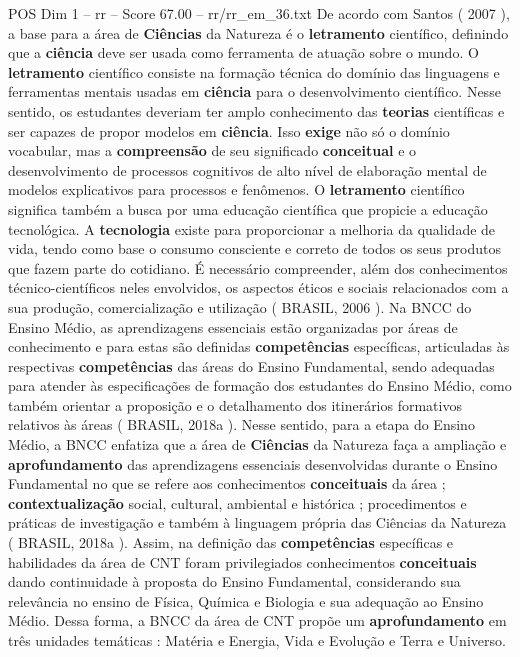 \begin{textsample}{POS Dim 1 – rr – Score 67.00 – rr/rr\_em\_36.txt}
De acordo com Santos ( 2007 ), a base para a área de \textbf{Ciências} da Natureza é o \textbf{letramento} científico, definindo que a \textbf{ciência} deve ser usada como ferramenta de atuação sobre o mundo.
O \textbf{letramento} científico consiste na formação técnica do domínio das linguagens e ferramentas mentais usadas em \textbf{ciência} para o desenvolvimento científico.
Nesse sentido, os estudantes deveriam ter amplo conhecimento das \textbf{teorias} científicas e ser capazes de propor modelos em \textbf{ciência}.
Isso \textbf{exige} não só o domínio vocabular, mas a \textbf{compreensão} de seu significado \textbf{conceitual} e o desenvolvimento de processos cognitivos de alto nível de elaboração mental de modelos explicativos para processos e fenômenos.
O \textbf{letramento} científico significa também a busca por uma educação científica que propicie a educação tecnológica.
A \textbf{tecnologia} existe para proporcionar a melhoria da qualidade de vida, tendo como base o consumo consciente e correto de todos os seus produtos que fazem parte do cotidiano.
É necessário compreender, além dos conhecimentos técnico-científicos neles envolvidos, os aspectos éticos e sociais relacionados com a sua produção, comercialização e utilização ( BRASIL, 2006 ).
Na BNCC do Ensino Médio, as aprendizagens essenciais estão organizadas por áreas de conhecimento e para estas são definidas \textbf{competências} específicas, articuladas às respectivas \textbf{competências} das áreas do Ensino Fundamental, sendo adequadas para atender às especificações de formação dos estudantes do Ensino Médio, como também orientar a proposição e o detalhamento dos itinerários formativos relativos às áreas ( BRASIL, 2018a ).
Nesse sentido, para a etapa do Ensino Médio, a BNCC enfatiza que a área de \textbf{Ciências} da Natureza faça a ampliação e \textbf{aprofundamento} das aprendizagens essenciais desenvolvidas durante o Ensino Fundamental no que se refere aos conhecimentos \textbf{conceituais} da área ; \textbf{contextualização} social, cultural, ambiental e histórica ; procedimentos e práticas de investigação e também à linguagem própria das Ciências da Natureza ( BRASIL, 2018a ).
Assim, na definição das \textbf{competências} específicas e habilidades da área de CNT foram privilegiados conhecimentos \textbf{conceituais} dando continuidade à proposta do Ensino Fundamental, considerando sua relevância no ensino de Física, Química e Biologia e sua adequação ao Ensino Médio.
Dessa forma, a BNCC da área de CNT propõe um \textbf{aprofundamento} em três unidades temáticas : Matéria e Energia, Vida e Evolução e Terra e Universo.

\end{textsample}
